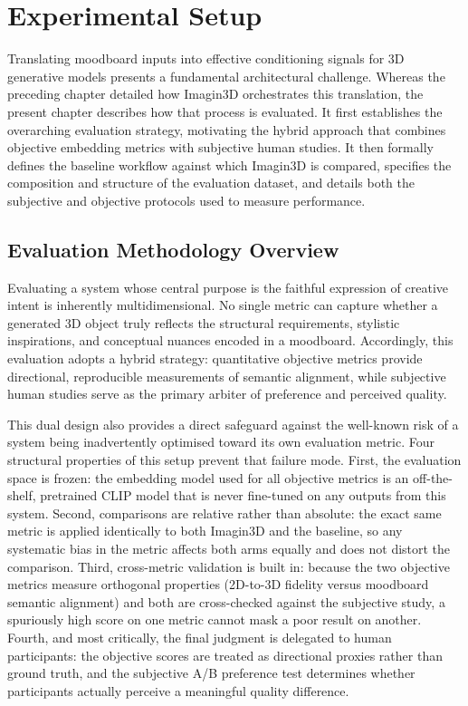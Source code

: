 \chapter{Experimental Setup}
\label{chap:expsetup}

Translating moodboard inputs into effective conditioning signals for 3D generative models presents a fundamental architectural challenge. Whereas the preceding chapter detailed how Imagin3D orchestrates this translation, the present chapter describes how that process is evaluated. It first establishes the overarching evaluation strategy, motivating the hybrid approach that combines objective embedding metrics with subjective human studies. It then formally defines the baseline workflow against which Imagin3D is compared, specifies the composition and structure of the evaluation dataset, and details both the subjective and objective protocols used to measure performance.

\section{Evaluation Methodology Overview}

Evaluating a system whose central purpose is the faithful expression of creative intent is inherently multidimensional. No single metric can capture whether a generated 3D object truly reflects the structural requirements, stylistic inspirations, and conceptual nuances encoded in a moodboard. Accordingly, this evaluation adopts a hybrid strategy: quantitative objective metrics provide directional, reproducible measurements of semantic alignment, while subjective human studies serve as the primary arbiter of preference and perceived quality.

This dual design also provides a direct safeguard against the well-known risk of a system being inadvertently optimised toward its own evaluation metric. Four structural properties of this setup prevent that failure mode. First, the evaluation space is frozen: the embedding model used for all objective metrics is an off-the-shelf, pretrained CLIP model that is never fine-tuned on any outputs from this system. Second, comparisons are relative rather than absolute: the exact same metric is applied identically to both Imagin3D and the baseline, so any systematic bias in the metric affects both arms equally and does not distort the comparison. Third, cross-metric validation is built in: because the two objective metrics measure orthogonal properties (2D-to-3D fidelity versus moodboard semantic alignment) and both are cross-checked against the subjective study, a spuriously high score on one metric cannot mask a poor result on another. Fourth, and most critically, the final judgment is delegated to human participants: the objective scores are treated as directional proxies rather than ground truth, and the subjective A/B preference test determines whether participants actually perceive a meaningful quality difference.

